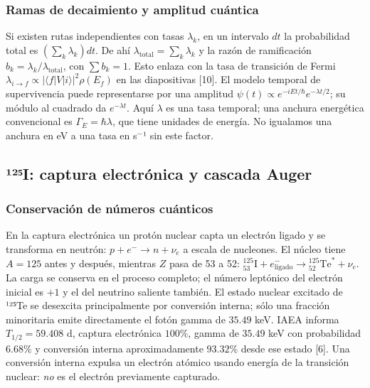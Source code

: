 \documentclass[11pt,a4paper,oneside]{article}
\begin{document}
\subsubsection{Ramas de decaimiento y amplitud cuántica}\label{ramas-de-decaimiento-y-amplitud-cuuxe1ntica}

Si existen rutas independientes con tasas \(\lambda_k\), en un intervalo \(dt\) la probabilidad total es \((\sum_k\lambda_k)dt\). De ahí \(\lambda_{\mathrm{total}}=\sum_k\lambda_k\) y la razón de ramificación \(b_k=\lambda_k/\lambda_{\mathrm{total}}\), con \(\sum b_k=1\). Esto enlaza con la tasa de transición de Fermi \(\lambda_{i\to f}\propto |\langle f|V|i\rangle|^2\rho(E_f)\) en las diapositivas {[}10{]}. El modelo temporal de supervivencia puede representarse por una amplitud \(\psi(t)\propto e^{-iEt/\hbar}e^{-\lambda t/2}\); su módulo al cuadrado da \(e^{-\lambda t}\). Aquí \(\lambda\) es una tasa temporal; una anchura energética convencional es \(\Gamma_E=\hbar\lambda\), que tiene unidades de energía. No igualamos una anchura en eV a una tasa en s\(^{-}\)¹ sin este factor.

\subsection{¹²⁵I: captura electrónica y cascada Auger}\label{i-captura-electruxf3nica-y-cascada-auger}

\subsubsection{Conservación de números cuánticos}\label{conservaciuxf3n-de-nuxfameros-cuuxe1nticos}

En la captura electrónica un protón nuclear capta un electrón ligado y se transforma en neutrón: \(p+e^-\rightarrow n+\nu_e\) a escala de nucleones. El núcleo tiene \(A=125\) antes y después, mientras \(Z\) pasa de 53 a 52: \(^{125}_{53}\mathrm{I}+e^-_{\mathrm{ligado}}\to{}^{125}_{52}\mathrm{Te}^*+\nu_e\). La carga se conserva en el proceso completo; el número leptónico del electrón inicial es \(+1\) y el del neutrino saliente también. El estado nuclear excitado de ¹²⁵Te se desexcita principalmente por conversión interna; sólo una fracción minoritaria emite directamente el fotón gamma de \(35.49\) keV. IAEA informa \(T_{1/2}=59.408\) d, captura electrónica \(100\%\), gamma de \(35.49\) keV con probabilidad \(6.68\%\) y conversión interna aproximadamente \(93.32\%\) desde ese estado {[}6{]}. Una conversión interna expulsa un electrón atómico usando energía de la transición nuclear: \emph{no} es el electrón previamente capturado.
\end{document}
